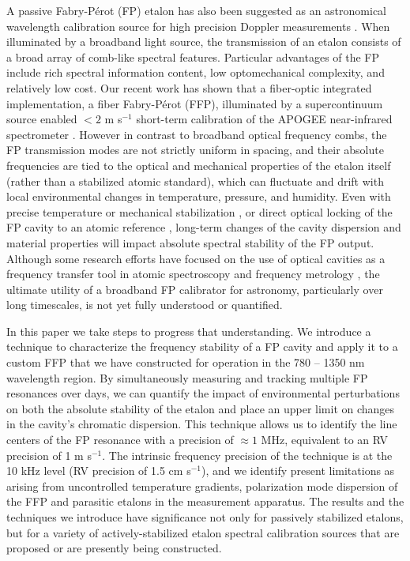 \documentclass[10pt]{article}
\newcommand{\fabper}{Fabry-P{\'e}rot}
\begin{document}
A passive {\fabper} (FP) etalon has also been suggested as an astronomical wavelength calibration source for high precision Doppler measurements \cite{Wildi:2012, Halverson:2014a, Reiners:2014}.  When illuminated by a broadband light source, the transmission of an etalon consists of a broad array of comb-like spectral features. Particular advantages of the FP include rich spectral information content, low optomechanical complexity, and relatively low cost. Our recent work has shown that a fiber-optic integrated implementation, a fiber {\fabper} (FFP), illuminated by a supercontinuum source enabled $<2$ m s$^{-1}$ short-term calibration of the APOGEE near-infrared spectrometer \cite{Halverson:2014a}. However in contrast to broadband optical frequency combs, the FP transmission modes are not strictly uniform in spacing, and their absolute frequencies are tied to the optical and mechanical properties of the etalon itself (rather than a stabilized atomic standard), which can fluctuate and drift with local environmental changes in temperature, pressure, and humidity. Even with precise temperature or mechanical stabilization \cite{Wildi:2012, Halverson:2014a}, or direct optical locking of the FP cavity to an atomic reference \cite{Schwab:2015}, long-term changes of the cavity dispersion and material properties will impact absolute spectral stability of the FP output. Although some research efforts have focused on the use of optical cavities as a frequency transfer tool in atomic spectroscopy and frequency metrology \cite{DeVoe:1988, Banerjee:2003, Singh:2012, Maleki:2010, Jones:2004}, the  ultimate utility of a broadband FP calibrator for astronomy, particularly over long timescales, is not yet fully understood or quantified. 

In this paper we take steps to progress that understanding.  We introduce a technique to characterize the frequency stability of a FP cavity and apply it to a custom FFP that we have constructed for operation in the 780 -- 1350 nm wavelength region.  By simultaneously measuring and tracking multiple FP resonances over days, we can quantify the impact of environmental perturbations on both the absolute stability of the etalon and place an upper limit on changes in the cavity's chromatic dispersion. This technique allows us to identify the line centers of the FP resonance with a precision of $\approx 1$ MHz, equivalent to an RV precision of 1 m s$^{-1}$.  The intrinsic frequency precision of the technique is at the 10 kHz level (RV precision of 1.5 cm s$^{-1}$), and we identify present limitations as arising from uncontrolled temperature gradients, polarization mode dispersion of the FFP and parasitic etalons in the measurement apparatus. The results and the techniques we introduce have significance not only for passively stabilized etalons, but for a variety of actively-stabilized etalon spectral calibration sources that are proposed or are presently being constructed.
\end{document}
